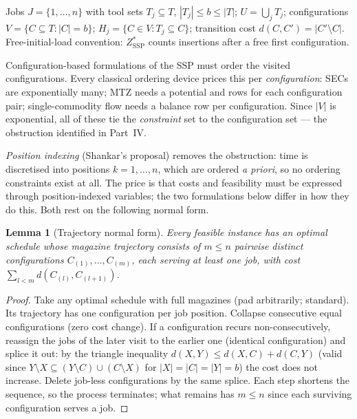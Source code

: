 \documentclass[11pt,a4paper]{article}
\theoremstyle{plain}
\newtheorem{lemma}[theorem]{Lemma}
\theoremstyle{definition}
\newcommand{\ZSSP}{Z_{\mathrm{SSP}}^{*}}
\begin{document}
Jobs $J=\{1,\dots,n\}$ with tool sets $T_j\subseteq T$, $|T_j|\le b\le|T|$;
$U=\bigcup_jT_j$; configurations $V=\{C\subseteq T:|C|=b\}$;
$H_j=\{C\in V:T_j\subseteq C\}$; transition cost $d(C,C')=|C'\setminus C|$.
Free-initial-load convention: $\ZSSP$ counts insertions after a free first
configuration.

Configuration-based formulations of the SSP must order the visited configurations.
Every classical ordering device prices this per \emph{configuration}: SECs are
exponentially many; MTZ needs a potential and rows for each configuration pair;
single-commodity flow needs a balance row per configuration. Since $|V|$ is
exponential, all of these tie the \emph{constraint} set to the configuration set ---
the obstruction identified in Part~IV.

\emph{Position indexing} (Shankar's proposal) removes the obstruction: time is
discretised into positions $k=1,\dots,n$, which are ordered \emph{a priori}, so no
ordering constraints exist at all. The price is that costs and feasibility must be
expressed through position-indexed variables; the two formulations below differ in
how they do this. Both rest on the following normal form.

\begin{thmbox}
\begin{lemma}[Trajectory normal form]
\label{lem:nf}
Every feasible instance has an optimal schedule whose magazine trajectory consists of
$m\le n$ \emph{pairwise distinct} configurations $C_{(1)},\dots,C_{(m)}$, each serving
at least one job, with cost $\sum_{l<m} d(C_{(l)},C_{(l+1)})$.
\end{lemma}
\end{thmbox}
\begin{proofbox}
\begin{proof}
Take any optimal schedule with full magazines (pad arbitrarily; standard). Its
trajectory has one configuration per job position. Collapse consecutive equal
configurations (zero cost change). If a configuration recurs non-consecutively,
reassign the jobs of the later visit to the earlier one (identical configuration)
and splice it out: by the triangle inequality $d(X,Y)\le d(X,C)+d(C,Y)$ (valid since
$Y\setminus X\subseteq(Y\setminus C)\cup(C\setminus X)$ for $|X|=|C|=|Y|=b$) the cost
does not increase. Delete job-less configurations by the same splice. Each step
shortens the sequence, so the process terminates; what remains has $m\le n$ since
each surviving configuration serves a job.
\end{proof}
\end{proofbox}
\end{document}
